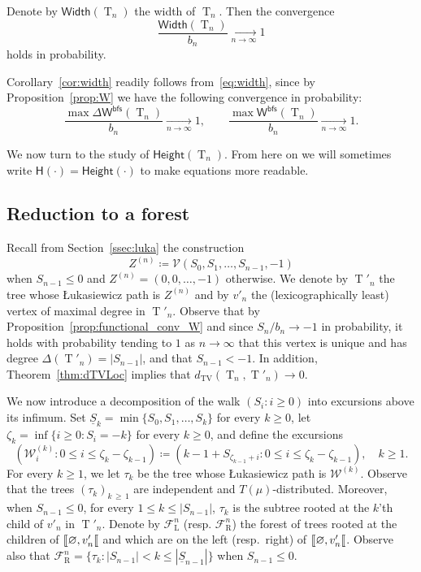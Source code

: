 \documentclass[AHL,Unicode,longabstracts,published]{cedram}
\newcommand*\W{\mathsf{W}}
\renewcommand{\H}{\mathsf{Height}}
\newcommand{\height}{\mathsf{H}}
\newcommand{\bfs}{\mathsf{bfs}}
\newcommand{\Width}{\mathsf{Width}}
\DeclareMathOperator{\rtree}{T}
\DeclareMathOperator{\TV}{TV}
\DeclareMathOperator{\rmL}{L}
\DeclareMathOperator{\rmR}{R}
\newcommand{\cF}{\mathcal{F}}
\newcommand{\cV}{\mathcal{V}}
\newcommand{\cW}{\mathcal{W}}
\newcommand{\llbracket}{\mathopen{[\mkern -2.7mu[}}
\begin{document}
\begin{coro}\label{cor:width}
Denote by $\Width(\rtree_{n})$ the width of $ \rtree_{ n}$. Then the convergence
\[
\frac{\Width(\rtree_{n})}{b_n}  \xrightarrow[n\to\infty]{}  1
\]
holds in probability.
\end{coro}

Corollary~\ref{cor:width} readily follows from~\eqref{eq:width}, since by Proposition~\ref{prop:W} we have the following convergence in probability:
\[
\frac{\max\Delta\W^{\bfs}(\rtree_{n}) }{ b_{n} }  \xrightarrow[n\to\infty]{}  1, \qquad \frac{\max \W^{\bfs}(\rtree_{n})}{ b_{n} }  \xrightarrow[n\to\infty]{}  1.
\]


We now turn to the study of $\H(\rtree_{n})$. From here on we will sometimes write $\height(\cdot)=\H(\cdot)$ to make equations more readable.

\subsection{Reduction to a forest}\label{ssec:forest}
Recall from Section~\ref{ssec:luka} the construction
\[
Z^{(n)} \coloneqq \cV(S_0,S_1,\ldots,S_{n-1},-1)
\]
when $S_{n-1} \le 0$ and $Z^{(n)}=(0,0, \ldots,-1)$ otherwise. We denote by $ \rtree'_{n}$ the tree whose {\L}ukasiewicz path is $Z^{(n)}$ and by $v'_n$ the (lexicographically least) vertex of maximal degree in $\rtree'_{ n}$. Observe that by Proposition~\ref{prop:functional_conv_W} and since $S_{n}/b_{n} \rightarrow -1$ in probability, it holds with probability tending to $1$ as $n \rightarrow \infty$ that this vertex is unique and has degree $\Delta(\rtree'_{ n})= \vert S_{n-1} \vert$, and that $S_{n-1}<-1$. In addition, Theorem~\ref{thm:dTVLoc} implies that $d_{\TV}(\rtree_{n},\rtree'_{n}) \rightarrow 0$.

We now introduce a decomposition of the walk $(S_i : i \geq 0)$ into excursions above its infimum. Set $\underline{S}_{k} = \min \{S_{0}, S_{1}, \ldots,S_{k}\}$ for every $k \geq 0$, let $\zeta_{k}=\inf\{i\geq 0 : S_i=-k\}$ for every $k\geq 0$, and define the excursions
\[
\left(\cW^{(k)}_i : 0 \leq i \leq \zeta_{k}-\zeta_{k-1} \right) \coloneqq \left(k-1+S_{\zeta_{k-1}+i} : 0 \leq i \leq \zeta_{k}-\zeta_{k-1} \right), \quad k\geq 1.
\]
For every $k\geq 1$, we let $\tau_k$ be the tree whose {\L}ukasiewicz path is $\cW^{(k)}$. Observe that the trees $(\tau_k)_{k\,\ge\,1}$ are independent and $T(\mu)$-distributed. Moreover, when $S_{n-1} \leq 0$, for every $1\leq k \leq \vert S_{n-1}\vert$, $\tau_k$ is the subtree rooted at the $k$'th child of $v'_n$ in $\rtree'_{n}$. Denote by $ \cF^{n}_{\rmL}$ (resp. $ \cF^{n}_{\rmR}$) the forest of trees rooted at the children of $\llbracket \varnothing, v'_{n} \llbracket$ and which are on the left (resp.\ right) of $\llbracket \varnothing, v'_{n} \llbracket$. Observe also that $ \cF^{n}_{\rmR} = \{ \tau_k : |S_{n-1}|<k \leq |\underline{S}_{n-1}| \} $ when $S_{n-1} \leq 0$.
\end{document}
